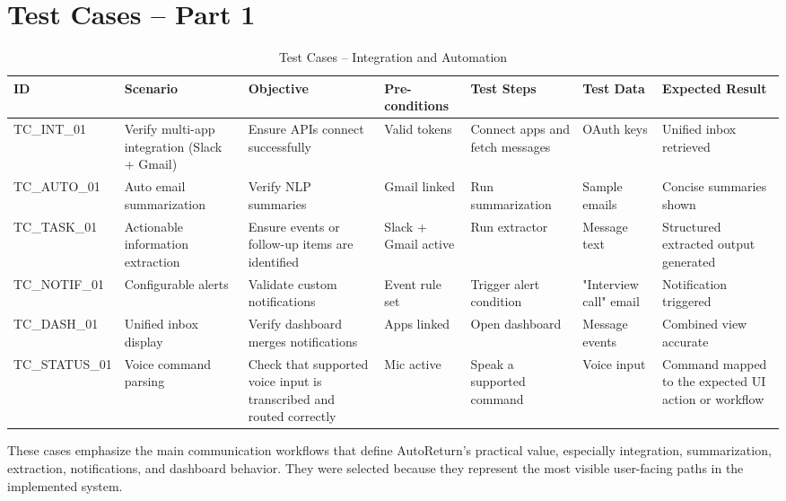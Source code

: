 \section{Test Cases -- Part 1}
\begin{table}[!htbp]
\centering
\footnotesize
\renewcommand{\arraystretch}{1.15}
\setlength{\tabcolsep}{5pt}
\begin{adjustbox}{max width=\textwidth}
\begin{tabularx}{\textwidth}{|l|Y|Y|Y|Y|Y|Y|}
\hline
\textbf{ID} & \textbf{Scenario} & \textbf{Objective} & \textbf{Pre-conditions} & \textbf{Test Steps} & \textbf{Test Data} & \textbf{Expected Result} \\ \hline
TC\_INT\_01 & Verify multi-app integration (Slack + Gmail) & Ensure APIs connect successfully & Valid tokens & Connect apps and fetch messages & OAuth keys & Unified inbox retrieved \\ \hline
TC\_AUTO\_01 & Auto email summarization & Verify NLP summaries & Gmail linked & Run summarization & Sample emails & Concise summaries shown \\ \hline
TC\_TASK\_01 & Actionable information extraction & Ensure events or follow-up items are identified & Slack + Gmail active & Run extractor & Message text & Structured extracted output generated \\ \hline
TC\_NOTIF\_01 & Configurable alerts & Validate custom notifications & Event rule set & Trigger alert condition & "Interview call" email & Notification triggered \\ \hline
TC\_DASH\_01 & Unified inbox display & Verify dashboard merges notifications & Apps linked & Open dashboard & Message events & Combined view accurate \\ \hline
TC\_STATUS\_01 & Voice command parsing & Check that supported voice input is transcribed and routed correctly & Mic active & Speak a supported command & Voice input & Command mapped to the expected UI action or workflow \\ \hline
\end{tabularx}
\end{adjustbox}
\caption{Test Cases – Integration and Automation}
\end{table}
\FloatBarrier

These cases emphasize the main communication workflows that define AutoReturn’s practical value, especially integration, summarization, extraction, notifications, and dashboard behavior. They were selected because they represent the most visible user-facing paths in the implemented system.

